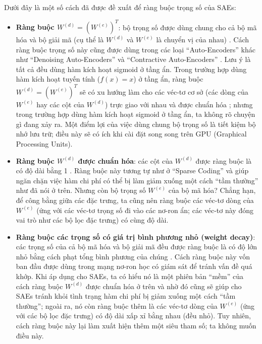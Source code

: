 Dưới đây là một số cách đã được đề xuất để ràng buộc trọng số của SAEs:
\begin{itemize}
	\item \textbf{Ràng buộc $W^{(d)} = (W^{(e)})^T$}: bộ trọng số được dùng chung cho cả bộ mã hóa và bộ giải mã (cụ thể là $W^{(d)}$ và $W^{(e)}$ là chuyển vị của nhau) \cite{coates2012demystifying}. Cách ràng buộc trọng số này cũng được dùng trong các loại ``Auto-Encoders'' khác như ``Denoising Auto-Encoders'' và ``Contractive Auto-Encoders'' \cite{vincent2008extracting}\cite{rifai2011contractive}\cite{rifai2011HCAEs}. Lưu ý là tất cả \cite{coates2012demystifying}\cite{vincent2008extracting}\cite{rifai2011contractive}\cite{rifai2011HCAEs} đều dùng hàm kích hoạt sigmoid ở tầng ẩn. Trong trường hợp dùng hàm kích hoạt tuyến tính ($f(x) = x$) ở tầng ẩn, ràng buộc $W^{(d)} = (W^{(e)})^T$ sẽ có xu hướng làm cho các véc-tơ cơ sở (các dòng của $W^{(e)}$ hay các cột của $W^{(d)}$) trực giao với nhau và được chuẩn hóa \cite{le2011ica}; nhưng trong trường hợp dùng hàm kích hoạt sigmoid ở tầng ẩn, ta không rõ chuyện gì đang xảy ra. Một điểm lợi của việc dùng chung bộ trọng số là tiết kiệm bộ nhớ lưu trữ; điều này sẽ có ích khi cài đặt song song trên GPU (Graphical Processing Units).
	\item \textbf{Ràng buộc $W^{(d)}$ được chuẩn hóa}: các cột của $W^{(d)}$ được ràng buộc là có độ dài bằng 1 \cite{zeiler2013rectified}. Ràng buộc này tương tự như ở ``Sparse Coding'' và giúp ngăn chặn việc hàm chi phí có thể bị làm giảm xuống một cách ``tầm thường'' như đã nói ở trên. Nhưng còn bộ trọng số $W^{(e)}$ của bộ mã hóa? Chẳng hạn, để công bằng giữa các đặc trưng, ta cũng nên ràng buộc các véc-tơ dòng của $W^{(e)}$ (ứng với các véc-tơ trọng số đi vào các nơ-ron ẩn; các véc-tơ này đóng vai trò như các bộ lọc đặc trưng) có cùng độ dài.
	\item \textbf{Ràng buộc các trọng số có giá trị bình phương nhỏ (weight decay)}: các trọng số của cả bộ mã hóa và bộ giải mã đều được ràng buộc là có độ lớn nhỏ bằng cách phạt tổng bình phương của chúng \cite{goodfellow2009measuring}\cite{coates2011analysis}. Cách ràng buộc này vốn ban đầu được dùng trong mạng nơ-ron học có giám sát để tránh vấn đề quá khớp. Khi áp dụng cho SAEs, ta có hiểu nó là một phiên bản ``mềm'' của cách ràng buộc $W^{(d)}$ được chuẩn hóa ở trên và nhờ đó cũng sẽ giúp cho SAEs tránh khỏi tình trạng hàm chi phí bị giảm xuống một cách ``tầm thường''; ngoài ra, nó còn ràng buộc thêm là các véc-tơ dòng của $W^{(e)}$ (ứng với các bộ lọc đặc trưng) có độ dài xấp xỉ bằng nhau (đều nhỏ). Tuy nhiên, cách ràng buộc này lại làm xuất hiện thêm một siêu tham số; ta không muốn điều này.
\end{itemize}


